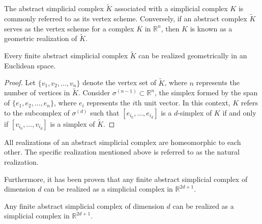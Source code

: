The abstract simplicial complex $\tilde{K}$ associated with a simplicial complex $K$ is commonly referred to as its vertex scheme. Conversely, if an abstract complex $\tilde{K}$ serves as the vertex scheme for a complex $K$ in $\mathbb{R}^n$, then $K$ is known as a geometric realization of $\tilde{K}$.

\begin{lemma}
Every finite abstract simplicial complex $\tilde{K}$ can be realized geometrically in an Euclidean space.
\end{lemma}

\begin{proof}
Let $\{v_1,v_2, \ldots, v_n\}$ denote the vertex set of $\tilde{K}$, where $n$ represents the number of vertices in $\tilde{K}$. Consider $\sigma^{(n-1)} \subset \mathbb{R}^n$, the simplex formed by the span of $\{e_1, e_2, \ldots, e_n\}$, where $e_i$ represents the $i$th unit vector. In this context, $K$ refers to the subcomplex of $\sigma^{(d)}$ such that $[e_{i_0}, \ldots, e_{i_d}]$ is a $d$-simplex of $K$ if and only if $[v_{i_0}, \ldots, v_{i_d}]$ is a simplex of $\tilde{K}$.
\end{proof}

\begin{remark}
All realizations of an abstract simplicial complex are homeomorphic to each other. The specific realization mentioned above is referred to as the natural realization. 
\end{remark}

Furthermore, it has been proven that any finite abstract simplicial complex of dimension $d$ can be realized as a simplicial complex in $\mathbb{R}^{2d+1}$.

\begin{theorem}
Any finite abstract simplicial complex of dimension $d$ can be realized as a simplicial complex in $\mathbb{R}^{2d+1}$.
\end{theorem}

